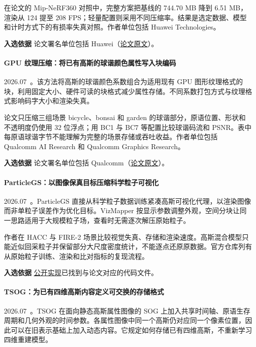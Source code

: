 在论文的 Mip-NeRF360 对照中，完整方案把基线的 744.70 MB 降到 6.51 MB，渲染从 124 提至 208 FPS；轻量配置则采用不同压缩率。结果是选定数据、模型和计时方式下的有损率失真对照。作者单位包括 Huawei Technologies。

\textbf{入选依据} 论文署名单位包括 Huawei（\href{https://arxiv.org/html/2607.12656v1}{论文原文}）。

\paragraph{GPU 纹理压缩：将已有高斯的球谐颜色属性写入块编码}
2026.07~\cite{2607_14513}。该方法将高斯的球谐颜色系数组合为适用现有 GPU 图形纹理格式的块，利用固定大小、硬件可读的块格式减少属性存储。不同系数打包方式与纹理格式影响码字大小和渲染失真。

论文只压缩三组场景 bicycle、bonsai 和 garden 的球谐部分，原语位置、形状和不透明度仍使用 32 位浮点；用 BC1 与 BC7 等配置比较球谐码流和 PSNR。表中每原语球谐字节不能理解为完整的场景存储或吞吐收益。作者单位包括 Qualcomm AI Research 和 Qualcomm Graphics Research。

\textbf{入选依据} 论文署名单位包括 Qualcomm（\href{https://arxiv.org/html/2607.14513v1}{论文原文}）。

\paragraph{ParticleGS：以图像保真目标压缩科学粒子可视化}
2026.07~\cite{2607_22956}。ParticleGS 直接从科学粒子数据训练紧凑高斯可视化代理，以渲染图像而非单粒子误差作为优化目标。VizMapper 按显示参数调整外观，空间分块让同一思路适用于大规模粒子场，查看时无需逐次解压原始粒子。

作者在 HACC 与 FIRE-2 场景比较视觉失真、存储和渲染速度。高斯混合模型只能近似回采粒子并保留部分大尺度密度统计，不能逐点还原原数据。官方仓库列有从原始粒子训练、渲染和比对指标的复现流程。

\textbf{入选依据} \href{https://github.com/bojiang03/particlegs}{公开实现}已找到与论文对应的代码文件。

\paragraph{TSOG：为已有四维高斯内容定义可交换的存储格式}
2026.07~\cite{2607_28049}。TSOG 在面向静态高斯属性图像的 SOG 上加入共享时间轴、原语生存周期和几何外观的时间参数。各属性图像中同一个高斯仍对应同一个像素位置，因此可以在旧表示基础上加入动态内容。它规定如何存储已有四维高斯，不重新学习四维重建模型。

